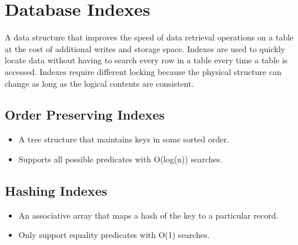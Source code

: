 \documentclass[11pt]{article}
\begin{document}
\maketitle
\thispagestyle{plain}

\section{Database Indexes}
A data structure that improves the speed of data retrieval operations on a table at the 
cost of additional writes and storage space.
Indexes are used to quickly locate data without having to search every row in a table 
every time a table is accessed.
Indexes require different locking because the physical structure can change as long as 
the logical contents are consistent.

\subsection*{Order Preserving Indexes}
\begin{itemize}
    \item
    A tree structure that maintains keys in some sorted order.
    
    \item
    Supports all possible predicates with O(log(n)) searches.
\end{itemize}

\subsection*{Hashing Indexes}
\begin{itemize}
    \item
    An associative array that maps a hash of the key to a particular record.
    
    \item
    Only support equality predicates with O(1) searches.
\end{itemize}

\end{document}

